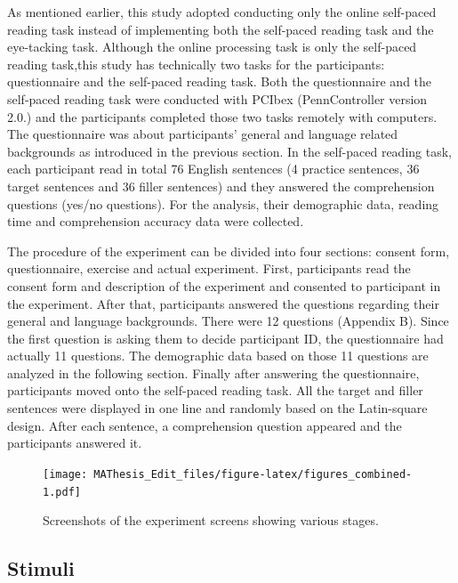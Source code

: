 \documentclass[
]{article}
\begin{document}
As mentioned earlier, this study adopted conducting only the online
self-paced reading task instead of implementing both the self-paced
reading task and the eye-tacking task. Although the online processing
task is only the self-paced reading task,this study has technically two
tasks for the participants: questionnaire and the self-paced reading
task. Both the questionnaire and the self-paced reading task were
conducted with PCIbex (PennController version 2.0.) and the participants
completed those two tasks remotely with computers. The questionnaire was
about participants' general and language related backgrounds as
introduced in the previous section. In the self-paced reading task, each
participant read in total 76 English sentences (4 practice sentences, 36
target sentences and 36 filler sentences) and they answered the
comprehension questions (yes/no questions). For the analysis, their
demographic data, reading time and comprehension accuracy data were
collected.

The procedure of the experiment can be divided into four sections:
consent form, questionnaire, exercise and actual experiment. First,
participants read the consent form and description of the experiment and
consented to participant in the experiment. After that, participants
answered the questions regarding their general and language backgrounds.
There were 12 questions (Appendix B). Since the first question is asking
them to decide participant ID, the questionnaire had actually 11
questions. The demographic data based on those 11 questions are analyzed
in the following section. Finally after answering the questionnaire,
participants moved onto the self-paced reading task. All the target and
filler sentences were displayed in one line and randomly based on the
Latin-square design. After each sentence, a comprehension question
appeared and the participants answered it.

\begin{figure}
\centering
\texttt{[image: MAThesis\_Edit\_files/figure-latex/figures\_combined-1.pdf]}
\caption{Screenshots of the experiment screens showing various stages.}
\end{figure}

\subsection{Stimuli}\label{stimuli}
\end{document}
